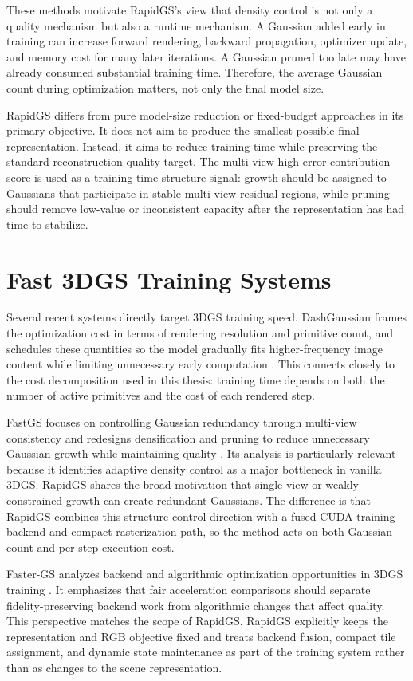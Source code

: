 These methods motivate RapidGS's view that density control is not only a quality mechanism but also a runtime mechanism. A Gaussian added early in training can increase forward rendering, backward propagation, optimizer update, and memory cost for many later iterations. A Gaussian pruned too late may have already consumed substantial training time. Therefore, the average Gaussian count during optimization matters, not only the final model size.

RapidGS differs from pure model-size reduction or fixed-budget approaches in its primary objective. It does not aim to produce the smallest possible final representation. Instead, it aims to reduce training time while preserving the standard reconstruction-quality target. The multi-view high-error contribution score is used as a training-time structure signal: growth should be assigned to Gaussians that participate in stable multi-view residual regions, while pruning should remove low-value or inconsistent capacity after the representation has had time to stabilize.

\section{Fast 3DGS Training Systems}

Several recent systems directly target 3DGS training speed. DashGaussian frames the optimization cost in terms of rendering resolution and primitive count, and schedules these quantities so the model gradually fits higher-frequency image content while limiting unnecessary early computation \cite{ChenCVPR2025DashGaussian}. This connects closely to the cost decomposition used in this thesis: training time depends on both the number of active primitives and the cost of each rendered step.

FastGS focuses on controlling Gaussian redundancy through multi-view consistency and redesigns densification and pruning to reduce unnecessary Gaussian growth while maintaining quality \cite{Ren2025FastGS}. Its analysis is particularly relevant because it identifies adaptive density control as a major bottleneck in vanilla 3DGS. RapidGS shares the broad motivation that single-view or weakly constrained growth can create redundant Gaussians. The difference is that RapidGS combines this structure-control direction with a fused CUDA training backend and compact rasterization path, so the method acts on both Gaussian count and per-step execution cost.

Faster-GS analyzes backend and algorithmic optimization opportunities in 3DGS training \cite{Hahlbohm2026FasterGS}. It emphasizes that fair acceleration comparisons should separate fidelity-preserving backend work from algorithmic changes that affect quality. This perspective matches the scope of RapidGS. RapidGS explicitly keeps the representation and RGB objective fixed and treats backend fusion, compact tile assignment, and dynamic state maintenance as part of the training system rather than as changes to the scene representation.

